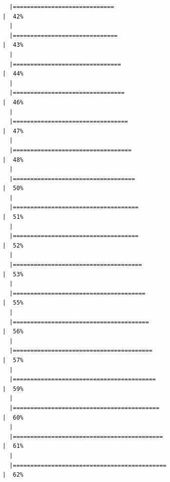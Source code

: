 \documentclass[
  letterpaper,
  DIV=11,
  numbers=noendperiod]{scrartcl}
\begin{document}
\begin{verbatim}
  |=============================                                         |  42%
  |                                                                            
  |==============================                                        |  43%
  |                                                                            
  |===============================                                       |  44%
  |                                                                            
  |================================                                      |  46%
  |                                                                            
  |=================================                                     |  47%
  |                                                                            
  |==================================                                    |  48%
  |                                                                            
  |===================================                                   |  50%
  |                                                                            
  |====================================                                  |  51%
  |                                                                            
  |====================================                                  |  52%
  |                                                                            
  |=====================================                                 |  53%
  |                                                                            
  |======================================                                |  55%
  |                                                                            
  |=======================================                               |  56%
  |                                                                            
  |========================================                              |  57%
  |                                                                            
  |=========================================                             |  59%
  |                                                                            
  |==========================================                            |  60%
  |                                                                            
  |===========================================                           |  61%
  |                                                                            
  |============================================                          |  62%

\end{verbatim}
\end{document}
